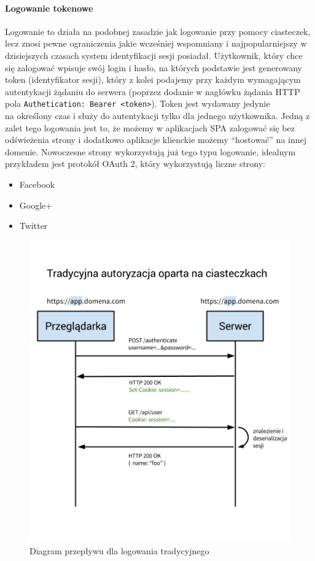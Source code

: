 \documentclass[10pt,titlepage]{article}
\begin{document}
\paragraph{Logowanie tokenowe}
Logowanie to działa na podobnej zasadzie jak logowanie przy pomocy ciasteczek, lecz znosi pewne ograniczenia jakie wcześniej wspomniany i najpopularniejszy w dzisiejszych czasach system identyfikacji sesji posiadał. Użytkownik, który chce się zalogować wpisuje swój login i hasło, na których podstawie jest generowany token (identyfikator sesji), który z kolei podajemy przy każdym wymagającym autentykacji żądaniu do serwera (poprzez dodanie w nagłówku żądania HTTP pola \verb|Authetication: Bearer <token>|). Token jest wydawany jedynie\\ na określony czas i służy do autentykacji tylko dla jednego użytkownika. Jedną z zalet tego logowania jest to, że możemy w aplikacjach SPA zalogować się bez odświeżenia strony i dodatkowo aplikacje klienckie możemy ``hostować'' na innej domenie. Nowoczesne strony wykorzystują już tego typu logowanie, idealnym przykładem jest protokół OAuth 2, który wykorzystują liczne strony:
\begin{itemize}
  \item Facebook
  \item Google+
  \item Twitter
\end{itemize}
\begin{figure}[H]
  \centering
  \includegraphics[scale=0.355]{images/tokenAuth1.png}
  \caption{Diagram przepływu dla logowania tradycyjnego}
\end{figure}
\end{document}
